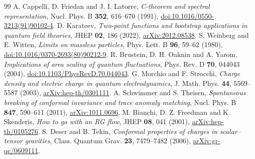 \documentclass[11pt]{article}
\begin{document}
\begin{thebibliography}{99}\small
{} A. Cappelli, D. Friedan and J. I. Latorre, \emph{C-theorem and spectral representation}, Nucl. Phys. B \textbf{352}, 616--670 (1991), \href{https://doi.org/10.1016/0550-3213(91)90102-4}{doi:10.1016/0550-3213(91)90102-4}.
 D. Karateev, \emph{Two-point functions and bootstrap applications in quantum field theories}, JHEP \textbf{02}, 186 (2022), \href{https://arxiv.org/abs/2012.08538}{arXiv:2012.08538}.
 S. Weinberg and E. Witten, \emph{Limits on massless particles}, Phys. Lett. B \textbf{96}, 59--62 (1980), \href{https://doi.org/10.1016/0370-2693(80)90212-9}{doi:10.1016/0370-2693(80)90212-9}.
 R. Brustein, D. H. Oaknin and A. Yarom, \emph{Implications of area scaling of quantum fluctuations}, Phys. Rev. D \textbf{70}, 044043 (2004), \href{https://doi.org/10.1103/PhysRevD.70.044043}{doi:10.1103/PhysRevD.70.044043}.
 G. Morchio and F. Strocchi, \emph{Charge density and electric charge in quantum electrodynamics}, J. Math. Phys. \textbf{44}, 5569--5587 (2003), \href{https://arxiv.org/abs/hep-th/0301111}{arXiv:hep-th/0301111}.
 A. Schwimmer and S. Theisen, \emph{Spontaneous breaking of conformal invariance and trace anomaly matching}, Nucl. Phys. B \textbf{847}, 590--611 (2011), \href{https://arxiv.org/abs/1011.0696}{arXiv:1011.0696}.
 M. Bianchi, D. Z. Freedman and K. Skenderis, \emph{How to go with an RG flow}, JHEP \textbf{08}, 041 (2001), \href{https://arxiv.org/abs/hep-th/0105276}{arXiv:hep-th/0105276}.
 S. Deser and B. Tekin, \emph{Conformal properties of charges in scalar--tensor gravities}, Class. Quantum Grav. \textbf{23}, 7479--7482 (2006), \href{https://arxiv.org/abs/gr-qc/0609111}{arXiv:gr-qc/0609111}.
\end{thebibliography}
\end{document}
